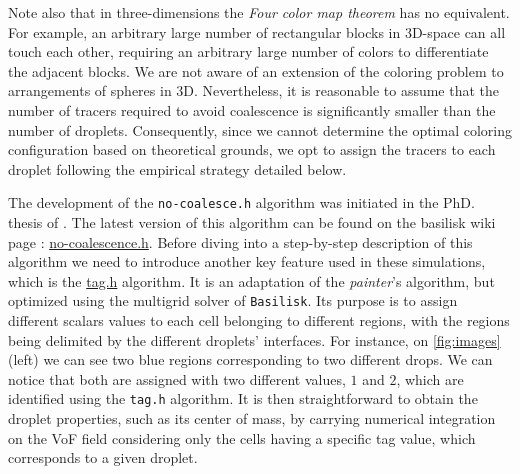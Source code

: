 Note also that in three-dimensions the \textit{Four color map theorem} has no equivalent.
For example, an arbitrary large number of rectangular blocks in 3D-space can all touch each other, requiring an arbitrary large number of colors to differentiate the adjacent blocks\citep{magnant2011coloring}. 
We are not aware of an extension of the coloring problem to arrangements of spheres in 3D. 
Nevertheless, it is reasonable to assume that the number of tracers required to avoid coalescence is significantly smaller than the number of droplets.
Consequently, since we cannot determine the optimal coloring configuration based on theoretical grounds, we opt to assign the tracers to each droplet following the empirical strategy detailed below.

The development of the \texttt{no-coalesce.h} algorithm was initiated in the PhD. thesis of \citet{mani2021numerical}.
The latest version of this algorithm can be found on the basilisk wiki page : \href{http://basilisk.fr/sandbox/fintzin/Rising-Suspenion/no-coalescence.h}{no-coalescence.h}.
Before  diving into a step-by-step description of this algorithm we need to introduce another key feature used in these simulations, which is the \href{http://basilisk.fr/src/tag.h}{tag.h} algorithm. 
It is an adaptation of the \textit{painter}'s algorithm, but optimized using the multigrid solver of \texttt{Basilisk}. 
Its purpose is to assign different scalars values to each cell belonging to different regions, with the regions being delimited by the different droplets' interfaces. 
For instance, on \ref{fig:images} (left) we can see two blue regions corresponding to two different drops.
We can notice that both are assigned with two different values, $1$ and $2$, which are identified using the \texttt{tag.h} algorithm. 
It is then straightforward to obtain the droplet properties, such as its center of mass, by carrying numerical integration on the VoF field considering only the cells having a specific tag value, which corresponds to a given droplet.  


